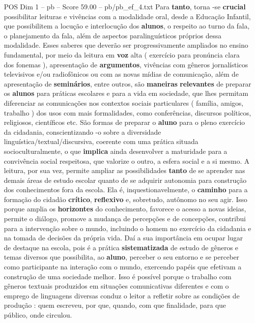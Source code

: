 \begin{textsample}{POS Dim 1 – pb – Score 59.00 – pb/pb\_ef\_4.txt}
Para \textbf{tanto}, torna -se \textbf{crucial} possibilitar leituras e vivências com a modalidade oral, desde a Educação Infantil, que possibilitem a locução e interlocução dos \textbf{alunos}, o respeito ao turno da fala, o planejamento da fala, além de aspectos paralinguísticos próprios dessa modalidade.
Esses saberes que deverão ser progressivamente ampliados no ensino fundamental, por meio da leitura em \textbf{voz} alta ( exercício para pronúncia clara dos fonemas ), apresentação de \textbf{argumentos}, vivências com gêneros jornalísticos televisivos e/ou radiofônicos ou com as novas mídias de comunicação, além de apresentação de \textbf{seminários}, entre outros, são \textbf{maneiras} \textbf{relevantes} de preparar os \textbf{alunos} para práticas escolares e para a vida em sociedade, que lhes permitam diferenciar as comunicações nos contextos sociais particulares ( família, amigos, trabalho ) dos usos com mais formalidades, como conferências, discursos políticos, religiosos, científicos etc.
São formas de preparar o \textbf{aluno} para o pleno exercício da cidadania, conscientizando -o sobre a diversidade linguística/textual/discursiva, coerente com uma prática situada socioculturalmente, o que \textbf{implica} ainda desenvolver a maturidade para a convivência social respeitosa, que valorize o outro, a esfera social e a si mesmo.
A leitura, por sua vez, permite ampliar as possibilidades \textbf{tanto} de se aprender nas demais áreas de estudo escolar quanto de se adquirir autonomia para construção dos conhecimentos fora da escola.
Ela é, inquestionavelmente, o \textbf{caminho} para a formação do cidadão \textbf{crítico}, \textbf{reflexivo} e, sobretudo, autônomo no seu agir.
Isso porque amplia os \textbf{horizontes} do conhecimento, favorece o acesso a novas ideias, permite o diálogo, promove a mudança de percepções e de concepções, contribui para a intervenção sobre o mundo, incluindo o homem no exercício da cidadania e na tomada de decisões da própria vida.
Daí a sua importância em ocupar lugar de destaque na escola, pois é a prática \textbf{sistematizada} de estudo de gêneros e temas diversos que possibilita, ao \textbf{aluno}, perceber o seu entorno e se perceber como participante na interação com o mundo, exercendo papéis que efetivam a construção de uma sociedade melhor.
Isso é possível porque o trabalho com gêneros textuais produzidos em situações comunicativas diferentes e com o emprego de linguagens diversas conduz o leitor a refletir sobre as condições de produção : quem escreveu, por que, quando, com que finalidade, para que público, onde circulou.

\end{textsample}
